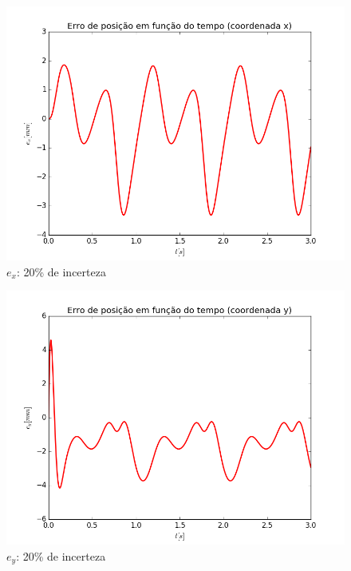 \documentclass[]{politex}
\begin{document}
\begin{multicols}{2}
\begin{figure}[H]
	\centering
	\includegraphics[scale=0.40]{imagens/ex_20.png}  
	\caption{$e_x$: 20\% de incerteza}
	\label{fig:ex_20}
\end{figure}
\begin{figure}[H]
	\centering
	\includegraphics[scale=0.40]{imagens/ey_20.png}  
	\caption{$e_y$: 20\% de incerteza}
	\label{fig:ey_20}
\end{figure}
\end{multicols}
\end{document}
